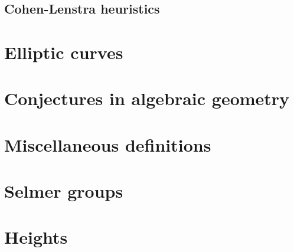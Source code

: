 \subsection{Cohen-Lenstra heuristics}





\appendix

\section{Elliptic curves}












\section{Conjectures in algebraic geometry}




\section{Miscellaneous definitions}





\section{Selmer groups}



\section{Heights}


